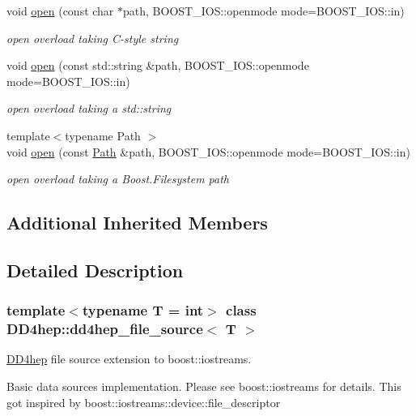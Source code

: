 \begin{DoxyCompactItemize}
void \hyperlink{class_d_d4hep_1_1dd4hep__file__source_ac9d66c792e2fa69fa7c9df98d8d45850}{open} (const char $\ast$path, B\+O\+O\+S\+T\+\_\+\+I\+O\+S\+::openmode mode=B\+O\+O\+S\+T\+\_\+\+I\+O\+S\+::in)
\begin{DoxyCompactList}\small\item\em open overload taking C-\/style string \end{DoxyCompactList}\item 
void \hyperlink{class_d_d4hep_1_1dd4hep__file__source_aae3ce079b4789a40e59a56e2496e6b8b}{open} (const std\+::string \&path, B\+O\+O\+S\+T\+\_\+\+I\+O\+S\+::openmode mode=B\+O\+O\+S\+T\+\_\+\+I\+O\+S\+::in)
\begin{DoxyCompactList}\small\item\em open overload taking a std\+::string \end{DoxyCompactList}\item 
{\footnotesize template$<$typename Path $>$ }\\void \hyperlink{class_d_d4hep_1_1dd4hep__file__source_a4bec0d30d5cbb97c505726ce8c9b1712}{open} (const \hyperlink{class_d_d4hep_1_1_path}{Path} \&path, B\+O\+O\+S\+T\+\_\+\+I\+O\+S\+::openmode mode=B\+O\+O\+S\+T\+\_\+\+I\+O\+S\+::in)
\begin{DoxyCompactList}\small\item\em open overload taking a Boost.\+Filesystem path \end{DoxyCompactList}\end{DoxyCompactItemize}
\subsection*{Additional Inherited Members}


\subsection{Detailed Description}
\subsubsection*{template$<$typename T = int$>$\newline
class D\+D4hep\+::dd4hep\+\_\+file\+\_\+source$<$ T $>$}

\hyperlink{namespace_d_d4hep}{D\+D4hep} file source extension to boost\+::iostreams. 

Basic data sources implementation. Please see boost\+::iostreams for details. This got inspired by boost\+::iostreams\+::device\+::file\+\_\+descriptor

